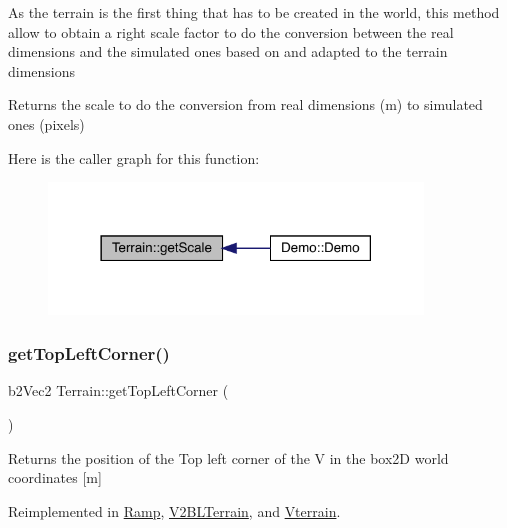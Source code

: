 As the terrain is the first thing that has to be created in the world, this method allow to obtain a right scale factor to do the conversion between the real dimensions and the simulated ones based on and adapted to the terrain dimensions \begin{DoxyReturn}{Returns}
the scale to do the conversion from real dimensions (m) to simulated ones (pixels) 
\end{DoxyReturn}
Here is the caller graph for this function\+:\nopagebreak
\begin{figure}[H]
\begin{center}
\leavevmode
\includegraphics[width=282pt]{class_terrain_af0cff27a194359a13c448c89bd374de3_icgraph}
\end{center}
\end{figure}
\mbox{\label{class_terrain_a8a8629396e5cb03961649acdc23eacf2}} 
\subsubsection{\texorpdfstring{get\+Top\+Left\+Corner()}{getTopLeftCorner()}}
{\footnotesize\ttfamily b2\+Vec2 Terrain\+::get\+Top\+Left\+Corner (\begin{DoxyParamCaption}{ }\end{DoxyParamCaption})\hspace{0.3cm}{\ttfamily [virtual]}}

\begin{DoxyReturn}{Returns}
the position of the Top left corner of the V in the box2D world coordinates \mbox{[}m\mbox{]} 
\end{DoxyReturn}


Reimplemented in \mbox{\hyperlink{class_ramp_aefcb53f7b43d3706400e7f16c77a7e18}{Ramp}}, \mbox{\hyperlink{class_v2_b_l_terrain_a57bfd1489ee3074d08513865f2197897}{V2\+B\+L\+Terrain}}, and \mbox{\hyperlink{class_vterrain_a2a6ee2632c67ebe63871e7954bb199b1}{Vterrain}}.

